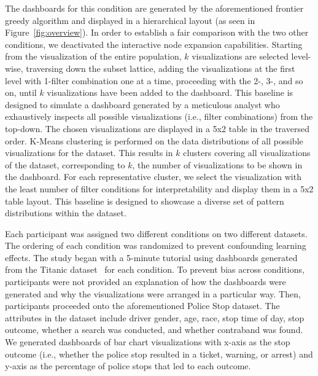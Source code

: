 \stitle{\system:} The dashboards for this condition are generated by the aforementioned frontier greedy algorithm and displayed in a hierarchical layout (as seen in Figure~\ref{fig:overview}).  In order to establish a fair comparison with the two other conditions, we deactivated  the interactive node expansion capabilities.
 Starting from the visualization of the entire population, $k$ visualizations are selected level-wise, traversing down the subset lattice, adding the visualizations at the first level with 1-filter combination one at a time, proceeding with the 2-, 3-, and so on, until $k$ visualizations have been added to the dashboard. This baseline is designed to simulate a dashboard generated by a meticulous analyst who exhaustively inspects all possible visualizations (i.e., filter combinations) from the top-down. The chosen visualizations are displayed in a 5x2 table in the traversed order.
\stitle{\cluster:} K-Means clustering is performed on the data distributions of all possible visualizations for the dataset. This results in $k$ clusters covering all visualizations of the dataset, corresponding to $k$, the number of visualizations to be shown in the dashboard. For each representative cluster, we select the visualization with the least number of filter conditions for interpretability and display them in a 5x2 table layout.  This baseline is designed to showcase a diverse set of pattern distributions within the dataset.
\par Each participant was assigned two different conditions on two different datasets. The ordering of each condition was randomized to prevent confounding learning effects. The study began with a 5-minute tutorial using dashboards generated from the Titanic dataset~\cite{titanic} for each condition. To prevent bias across conditions, participants were not provided an explanation of how the dashboards were generated and why the visualizations were arranged in a particular way. Then, participants proceeded onto the aforementioned Police Stop dataset. The attributes in the dataset include driver gender, age, race, stop time of day, stop outcome, whether a search was conducted, and whether contraband was found. We generated dashboards of bar chart visualizations with x-axis as the stop outcome (i.e., whether the police stop resulted in a ticket, warning, or arrest) and y-axis as the percentage of police stops that led to each outcome. %
